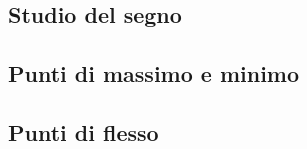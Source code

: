 \documentclass[a4paper]{article}
\begin{document}
		\subsection{Studio del segno}
		\subsection{Punti di massimo e minimo}
		\subsection{Punti di flesso}
	
	
	
	
	
	
	
	
	
	
	
	
	
	
	
	
	
	
	
	
	
	
	
	
	
	
	
	
	
	
	
	
	
	
	
	
	
	
	
	
	
	
	
	
	
	
	
	
	
	
	
	
	
	
	
\end{document}
